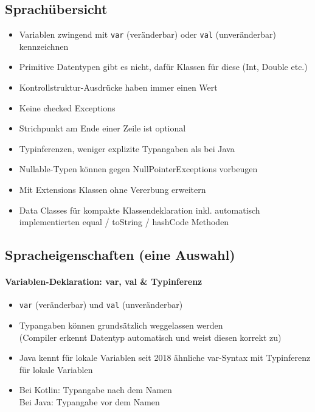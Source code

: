 \documentclass[a4paper]{article}
\begin{document}
		\subsection{Sprachübersicht}
		
			\begin{itemize}
				\item Variablen zwingend mit \texttt{var} (veränderbar) oder \texttt{val} (unveränderbar) kennzeichnen
				\item Primitive Datentypen gibt es nicht, dafür Klassen für diese (Int, Double etc.)
				\item Kontrollstruktur-Ausdrücke haben immer einen Wert
				\item Keine checked Exceptions
				\item Strichpunkt am Ende einer Zeile ist optional
				\item Typinferenzen, weniger explizite Typangaben als bei Java
				\item Nullable-Typen können gegen NullPointerExceptions vorbeugen
				\item Mit Extensions Klassen ohne Vererbung erweitern
				\item Data Classes für kompakte Klassendeklaration inkl. automatisch implementierten equal / toString / hashCode Methoden
			\end{itemize}
	
		\subsection{Spracheigenschaften (eine Auswahl)}
		
			\paragraph{Variablen-Deklaration: var, val \& Typinferenz}
			\begin{itemize}
				\item \texttt{var} (veränderbar) und \texttt{val} (unveränderbar)
				\item Typangaben können grundsätzlich weggelassen werden \\
					(Compiler erkennt Datentyp automatisch und weist diesen korrekt zu)
				\item Java kennt für lokale Variablen seit 2018 ähnliche var-Syntax mit Typinferenz für lokale Variablen
				\item Bei Kotlin: Typangabe nach dem Namen\\
					Bei Java: Typangabe vor dem Namen
			\end{itemize}
		
\end{document}
